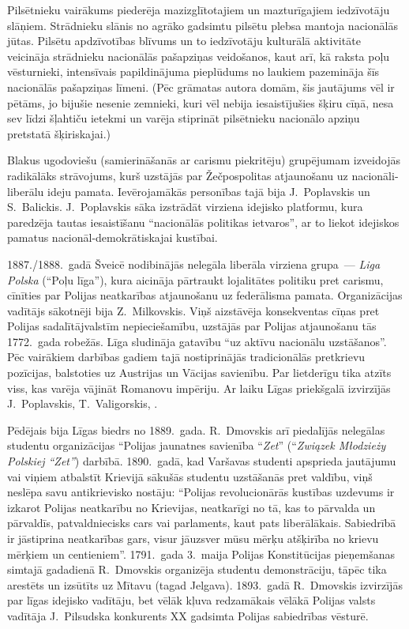 \documentclass[twoside,a5paper,12pt,fleqn,openany]{extbook}
\newcommand{\pltxti}[1]{\textit{\textpolish{#1}}}
\begin{document}
Pilsētnieku vairākums piederēja mazizglītotajiem un mazturīgajiem iedzīvotāju slāņiem. Strādnieku slānis no agrāko gadsimtu pilsētu plebsa mantoja nacionālās jūtas. Pilsētu apdzīvotības blīvums un to iedzīvotāju kulturālā aktivitāte veicināja strādnieku nacionālās pašapziņas veidošanos, kaut arī, kā raksta poļu vēsturnieki, intensīvais papildinājuma pieplūdums no laukiem pazemināja šīs nacionālās pašapziņas līmeni. (Pēc grāmatas autora domām, šis jautājums vēl ir pētāms, jo bijušie nesenie zemnieki, kuri vēl nebija iesaistījušies šķiru cīņā, nesa sev līdzi šļahtiču ietekmi un varēja stiprināt pilsētnieku nacionālo apziņu pretstatā šķiriskajai.)

Blakus ugodoviešu (samierināšanās ar carismu piekritēju) grupējumam izveidojās radikālāks strāvojums, kurš uzstājās par Žečpospolitas atjaunošanu uz nacionāli-liberālu ideju pamata. Ievērojamākās personības tajā bija J.~Poplavskis un S.~Balickis. J.~Poplavskis sāka izstrādāt virziena idejisko platformu, kura paredzēja tautas iesaistīšanu ``nacionālās politikas ietvaros'', ar to liekot idejiskos pamatus nacionāl-demokrātiskajai kustībai.

1887./1888.~gadā Šveicē nodibinājās nelegāla liberāla virziena grupa~--- \pltxti{Liga Polska} (``Poļu līga''), kura aicināja pārtraukt lojalitātes politiku pret carismu, cīnīties par Polijas neatkarības atjaunošanu uz federālisma pamata. Organizācijas vadītājs sākotnēji bija Z.~Milkovskis. Viņš aizstāvēja konsekventas cīņas pret Polijas sadalītājvalstīm nepieciešamību, uzstājās par Polijas atjaunošanu tās 1772.~gada robežās. Līga sludināja gatavību ``uz aktīvu nacionālu uzstāšanos''. Pēc vairākiem darbības gadiem tajā nostiprinājās tradicionālās pretkrievu pozīcijas, balstoties uz Austrijas un Vācijas savienību. Par lietderīgu tika atzīts viss, kas varēja vājināt Romanovu impēriju. Ar laiku Līgas priekšgalā izvirzījās J.~Poplavskis, T.~Valigorskis, .

Pēdējais bija Līgas biedrs no 1889.~gada. R.~Dmovskis arī piedalījās nelegālas studentu organizācijas ``Polijas jaunatnes savienība ``\pltxti{Zet}'' (``\pltxti{Związek Młodzieży Polskiej ``Zet''}) darbībā. 1890.~gadā, kad Varšavas studenti apsprieda jautājumu vai viņiem atbalstīt Krievijā sākušās studentu uzstāšanās pret valdību, viņš neslēpa savu antikrievisko nostāju: ``Polijas revolucionārās kustības uzdevums ir izkarot Polijas neatkarību no Krievijas, neatkarīgi no tā, kas to pārvalda un pārvaldīs, patvaldniecisks cars vai parlaments, kaut pats liberālākais. Sabiedrībā ir jāstiprina neatkarības gars, visur jāuzsver mūsu mērķu atšķirība no krievu mērķiem un centieniem''. 1791.~gada 3.~maija Polijas Konstitūcijas pieņemšanas simtajā gadadienā R.~Dmovskis organizēja studentu demonstrāciju, tāpēc tika arestēts un izsūtīts uz Mītavu (tagad Jelgava). 1893.~gadā R.~Dmovskis izvirzījās par līgas idejisko vadītāju, bet vēlāk kļuva redzamākais vēlākā Polijas valsts vadītāja J.~Pilsudska konkurents XX gadsimta Polijas sabiedrības vēsturē.
\end{document}
